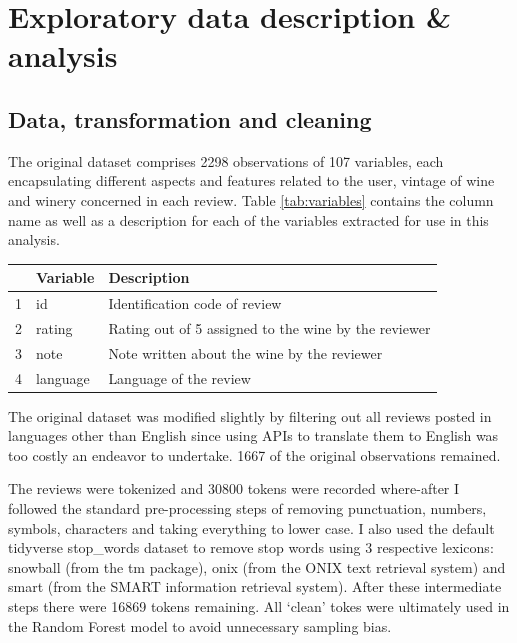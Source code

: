 \documentclass[11pt,preprint]{elsarticle}
\let\origtable\table
\let\endorigtable\endtable
\renewenvironment{table}[1][2] {
    \expandafter\origtable\expandafter[H]
} {
    \endorigtable
}
\numberwithin{equation}{section}
\numberwithin{figure}{section}
\numberwithin{table}{section}
\begin{document}
\newpage

\section{Exploratory data description \&
analysis}\label{exploratory-data-description-analysis}

\label{Data}

\subsection{Data, transformation and
cleaning}\label{data-transformation-and-cleaning}

The original dataset comprises 2298 observations of 107 variables, each
encapsulating different aspects and features related to the user,
vintage of wine and winery concerned in each review. Table
\ref{tab:variables} contains the column name as well as a description
for each of the variables extracted for use in this analysis.

\begin{table}[ht]
\centering
\begin{tabular}{|r|l|l|}
\hline
\textbf{} & \textbf{Variable} & \textbf{Description} \\
\hline
1 & id & Identification code of review \\
2 & rating & Rating out of 5 assigned to the wine by the reviewer \\
3 & note & Note written about the wine by the reviewer \\
4 & language & Language of the review \\
\hline
\end{tabular}
\caption{Description of Variables}
\label{tab:variables}
\end{table}

The original dataset was modified slightly by filtering out all reviews
posted in languages other than English since using APIs to translate
them to English was too costly an endeavor to undertake. 1667 of the
original observations remained.

The reviews were tokenized and 30800 tokens were recorded where-after I
followed the standard pre-processing steps of removing punctuation,
numbers, symbols, characters and taking everything to lower case. I also
used the default tidyverse stop\_words dataset to remove stop words
using 3 respective lexicons: snowball (from the tm package), onix (from
the ONIX text retrieval system) and smart (from the SMART information
retrieval system). After these intermediate steps there were 16869
tokens remaining. All `clean' tokes were ultimately used in the Random
Forest model to avoid unnecessary sampling bias.
\end{document}
